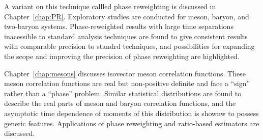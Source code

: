 A variant on this technique callled phase reweighting is discussed in Chapter~\ref{chap:PR}.
Exploratory studies are conducted for meson, baryon, and two-baryon systems.
Phase-reweighted results with large time separations inacessible to standard analysis techniques 
are found to give consistent results with comparable precision to standrd techniques,
and possibilities for expanding the scope and improving the precision of phase reweighting are highlighted.

Chapter~\ref{chap:mesons} discusses isovector meson correlation functions.
These meson correlation functions are real but non-positive definite and face a ``sign'' rather than a ``phase'' problem.
Similar statistical distributions are found to describe the real parts of meson and baryon correlation functions,
and the asymptotic time dependence of moments of this distribution is shownw to possess generic features.
Applications of phase reweighting and ratio-based estimators are discussed.


